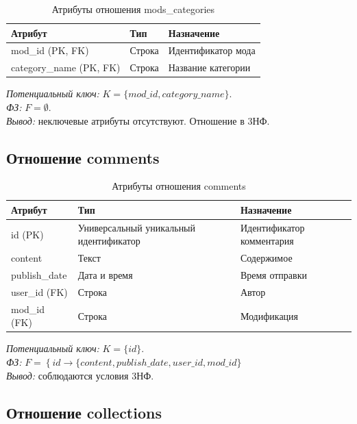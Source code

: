 \begin{table}[H]
	\centering
	\caption{Атрибуты отношения mods\_categories}
	\label{tab:mods_categories}
	\begin{tabularx}{\textwidth}{|l|X|X|}
		\hline
		\textbf{Атрибут} & \textbf{Тип} & \textbf{Назначение} \\
		\hline
		mod\_id (PK, FK) & Строка & Идентификатор мода \\
		\hline
		category\_name (PK, FK)& Строка & Название категории \\
		\hline
	\end{tabularx}
\end{table}

\textit{Потенциальный ключ:} $K = \{mod\_id, category\_name\}$. \\
\textit{ФЗ:} $F = \emptyset$. \\
\textit{Вывод:} неключевые атрибуты отсутствуют. Отношение в 3НФ.

\subsection*{Отношение comments}

\begin{table}[H]
	\centering
	\caption{Атрибуты отношения comments}
	\label{tab:comments}
	\begin{tabularx}{\textwidth}{|l|X|X|}
		\hline
		\textbf{Атрибут} & \textbf{Тип} & \textbf{Назначение} \\
		\hline
		id (PK) & Универсальный уникальный идентификатор & Идентификатор комментария \\
		\hline
		content & Текст & Содержимое \\
		\hline
		publish\_date & Дата и время & Время отправки \\
		\hline
		user\_id (FK) & Строка & Автор \\
		\hline
		mod\_id (FK) & Строка & Модификация \\
		\hline
	\end{tabularx}
\end{table}

\textit{Потенциальный ключ:} $K = \{id\}$. \\
\textit{ФЗ:} $F = \left\{ id \rightarrow \{content, publish\_date, user\_id, mod\_id\} \right.$ \\
\textit{Вывод:} соблюдаются условия 3НФ.

\subsection*{Отношение collections}

